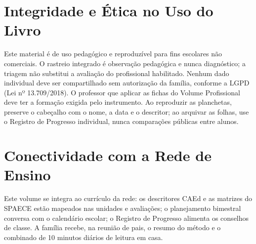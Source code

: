 \chapter{Integridade e Ética no Uso do Livro}

Este material é de uso pedagógico e reproduzível para fins escolares não comerciais. O rastreio integrado é observação pedagógica e nunca diagnóstico; a triagem não substitui a avaliação do profissional habilitado. Nenhum dado individual deve ser compartilhado sem autorização da família, conforme a LGPD (Lei nº 13.709/2018). O professor que aplicar as fichas do Volume Profissional deve ter a formação exigida pelo instrumento.
Ao reproduzir as planchetas, preserve o cabeçalho com o nome, a data e o descritor; ao arquivar as folhas, use o Registro de Progresso individual, nunca comparações públicas entre alunos.

\chapter{Conectividade com a Rede de Ensino}

Este volume se integra ao currículo da rede: os descritores CAEd e as matrizes do SPAECE estão mapeados nas unidades e avaliações; o planejamento bimestral conversa com o calendário escolar; o Registro de Progresso alimenta os conselhos de classe. A família recebe, na reunião de pais, o resumo do método e o combinado de 10 minutos diários de leitura em casa.
